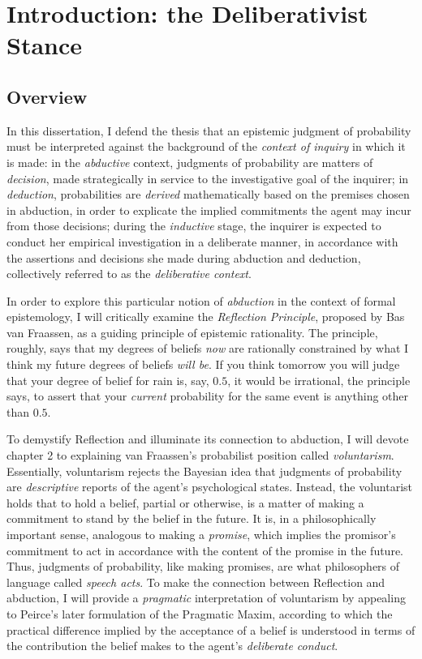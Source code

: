 
\hypertarget{introduction}{%
\chapter{Introduction: the Deliberativist Stance}\label{ch:introduction}}
\hypertarget{overview}{%
\section{Overview}\label{overview}}

In this dissertation, I defend the thesis that an epistemic judgment of
probability must be interpreted against the background of the
\emph{context of inquiry} in which it is made: in the \emph{abductive} context,
judgments of probability are matters of \emph{decision}, made
strategically in service to the investigative goal of the inquirer; in
\emph{deduction}, probabilities are \emph{derived} mathematically based on the
premises chosen in abduction, in order to explicate the implied
commitments the agent may incur from those decisions; during the
\emph{inductive} stage, the inquirer is expected to conduct her empirical
investigation in a deliberate manner, in accordance with the assertions and
decisions she made during abduction and deduction, collectively referred
to as the \emph{deliberative context}.

In order to explore this particular notion of \emph{abduction} in the
context of formal epistemology, I will critically examine the
\emph{Reflection Principle}, proposed by Bas van Fraassen, as a guiding
principle of epistemic rationality. The principle, roughly, says that my
degrees of beliefs \emph{now} are rationally constrained by what I think
my future degrees of beliefs \emph{will be}. If you think tomorrow you
will judge that your degree of belief for rain is, say, \(0.5\), it
would be irrational, the principle says, to assert that your \emph{current}
probability for the same event is anything other than \(0.5\).

To demystify Reflection and illuminate its connection to abduction, I
will devote chapter 2 to explaining van Fraassen's probabilist position
called \emph{voluntarism}. Essentially, voluntarism rejects the Bayesian
idea that judgments of probability are \emph{descriptive} reports of the
agent's psychological states. Instead, the voluntarist holds that to hold
a belief, partial or otherwise, is a matter of making a commitment to
stand by the belief in the future. It is, in a philosophically important
sense, analogous to making a \emph{promise}, which implies the
promisor's commitment to act in accordance with the content of the promise in the future. Thus, judgments of probability, like making promises, are what philosophers of language called \emph{speech acts}. To make the connection
between Reflection and abduction, I will provide a \emph{pragmatic}
interpretation of voluntarism by appealing to Peirce's later
formulation of the Pragmatic Maxim, according to which the practical difference implied by the acceptance of a belief is understood in terms of the contribution the belief makes to the agent's \emph{deliberate conduct}.

